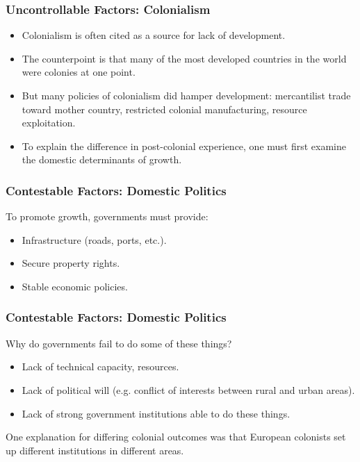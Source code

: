 \documentclass{beamer}
\begin{document}
\begin{frame} 
\frametitle{\LARGE{Uncontrollable Factors: Colonialism}}
\begin{itemize}
		\item Colonialism is often cited as a source for lack of development. \pause
		\item The counterpoint is that many of the most developed countries in the world were colonies at one point. \pause
		\item But many policies of colonialism did hamper development: mercantilist trade toward mother country, restricted colonial manufacturing, resource exploitation. \pause
		\item To explain the difference in post-colonial experience, one must first examine the domestic determinants of growth.
\end{itemize}
\end{frame}

\begin{frame} 
\frametitle{\LARGE{Contestable Factors: Domestic Politics}}
\begin{itemize}
	\large{
		\item To promote growth, governments must provide: \pause
		\begin{itemize}
		    \item Infrastructure (roads, ports, etc.). \pause 
		    \item Secure property rights. \pause 
		    \item Stable economic policies.  
		\end{itemize}
	}
\end{itemize}
\end{frame}

\begin{frame} 
	\frametitle{\LARGE{Contestable Factors: Domestic Politics}}
	\begin{itemize}
		\large{
			\item Why do governments fail to do some of these things? \pause 
			\begin{itemize}
				\item Lack of technical capacity, resources. \pause 
				\item Lack of political will (e.g. conflict of interests between rural and urban areas). \pause
				\item Lack of strong government institutions able to do these things.
			\end{itemize}
			\item One explanation for differing colonial outcomes was that European colonists set up different institutions in different areas.
		}
	\end{itemize}
\end{frame}
\end{document}
